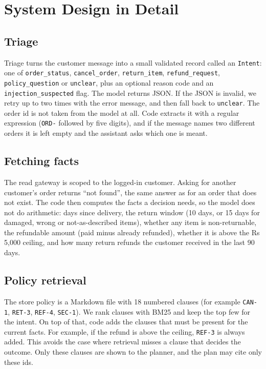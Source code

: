 \documentclass[11pt,a4paper]{article}
\begin{document}
\section{System Design in Detail}
\subsection{Triage}
Triage turns the customer message into a small validated record called an \texttt{Intent}: one of \texttt{order\_status}, \texttt{cancel\_order}, \texttt{return\_item}, \texttt{refund\_request}, \texttt{policy\_question} or \texttt{unclear}, plus an optional reason code and an \texttt{injection\_suspected} flag. The model returns JSON. If the JSON is invalid, we retry up to two times with the error message, and then fall back to \texttt{unclear}. The order id is not taken from the model at all. Code extracts it with a regular expression (\texttt{ORD-} followed by five digits), and if the message names two different orders it is left empty and the assistant asks which one is meant.

\subsection{Fetching facts}
The read gateway is scoped to the logged-in customer. Asking for another customer's order returns ``not found'', the same answer as for an order that does not exist. The code then computes the facts a decision needs, so the model does not do arithmetic: days since delivery, the return window (10 days, or 15 days for damaged, wrong or not-as-described items), whether any item is non-returnable, the refundable amount (paid minus already refunded), whether it is above the Rs 5,000 ceiling, and how many return refunds the customer received in the last 90 days.

\subsection{Policy retrieval}
The store policy is a Markdown file with 18 numbered clauses (for example \texttt{CAN-1}, \texttt{RET-3}, \texttt{REF-4}, \texttt{SEC-1}). We rank clauses with BM25 and keep the top few for the intent. On top of that, code adds the clauses that must be present for the current facts. For example, if the refund is above the ceiling, \texttt{REF-3} is always added. This avoids the case where retrieval misses a clause that decides the outcome. Only these clauses are shown to the planner, and the plan may cite only these ids.
\end{document}
